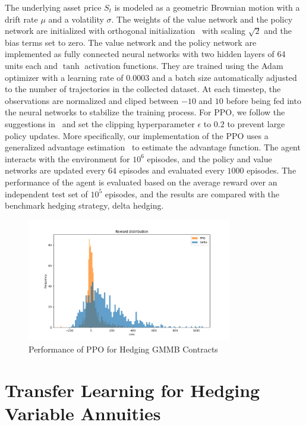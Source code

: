 The underlying asset price $S_t$ is modeled as a geometric Brownian motion with a drift rate $\mu$ and a volatility $\sigma$.
The weights of the value network and the policy network are initialized with orthogonal initialization~\citep{engstrom2020implementation} with scaling $\sqrt{2}$ and the bias terms set to zero.
The value network and the policy network are implemented as fully connected neural networks with two hidden layers of 64 units each and $\tanh$ activation functions.
They are trained using the Adam optimizer with a learning rate of $0.0003$ and a batch size automatically adjusted to the number of trajectories in the collected dataset.
At each timestep, the observations are normalized and cliped between $-10$ and $10$ before being fed into the neural networks to stabilize the training process.
For PPO, we follow the suggestions in~\cite{schulman2017proximal} and set the clipping hyperparameter $\epsilon$ to $0.2$ to prevent large policy updates. 
More specifically, our implementation of the PPO uses a generalized advantage estimation~\citep{schulman2015high} to estimate the advantage function.
The agent interacts with the environment for $10^6$ episodes, and the policy and value networks are updated every $64$ episodes and evaluated every $1000$ episodes.
The performance of the agent is evaluated based on the average reward over an independent test set of $10^5$ episodes, and the results are compared with the benchmark hedging strategy, delta hedging.

\begin{figure}
    \centering
    \includegraphics[width=0.8\textwidth]{./project3/figures/reward_distribution.png}
    \caption{Performance of PPO for Hedging GMMB Contracts} 
    \label{fig3:ppo_hedging}
\end{figure}

\section{Transfer Learning for Hedging Variable Annuities}

